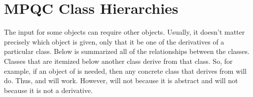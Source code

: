 
\chapter{MPQC Class Hierarchies}

The input for some objects can require other objects.  Usually, it doesn't
matter precisely which object is given, only that it be one of the
derivatives of a particular class.  Below is summarized all of the
relationships between the classes.  Classes that are itemized below another
class derive from that class.  So, for example, if an object of
 is needed, then any concrete class that derives from
 will do.  Thus,  and  will
work.  However,  will not because it is abstract and
 will not because it is not a derivative.


